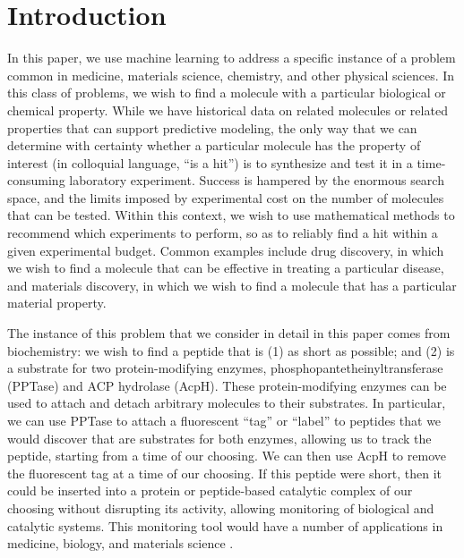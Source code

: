 \documentclass[12pt]{article}
\begin{document}


\section{Introduction}

In this paper, we use machine learning to address a specific instance of a problem common in medicine, materials science, chemistry, and other physical sciences.  In this class of problems, we wish to find a molecule with a particular biological or chemical property. While we have historical data on related molecules or related properties that can support predictive modeling, the only way that we can determine with certainty whether a particular molecule has the property of interest (in colloquial language, ``is a hit'') is to synthesize and test it in a time-consuming laboratory experiment. Success is hampered by the enormous search space, and the limits imposed by experimental cost on the number of molecules that can be tested.  Within this context, we wish to use mathematical methods to recommend which experiments to perform, so as to reliably find a hit within a given experimental budget. Common examples include drug discovery, in which we wish to find a molecule that can be effective in treating a particular disease, and materials discovery, in which we wish to find a molecule that has a particular material property.

The instance of this problem that we consider in detail in this paper comes from biochemistry: we wish to find a peptide that is (1) as short as possible; and (2) is a substrate for two protein-modifying enzymes, phosphopantetheinyltransferase (PPTase) and ACP hydrolase (AcpH). These protein-modifying enzymes can be used to attach and detach arbitrary molecules to their substrates.  In particular, 
we can use PPTase to attach a fluorescent ``tag'' or ``label'' to peptides that we would discover that are substrates for both enzymes, allowing us to track the peptide, starting from a time of our choosing.  We can then use AcpH to remove the fluorescent tag at a time of our choosing.  If this peptide were short, then it could be inserted into a protein or peptide-based catalytic complex of our choosing without disrupting its activity, allowing monitoring of biological and catalytic systems.  This monitoring tool would have a number of applications in medicine, biology, and materials science \citep{nick}.
\end{document}
